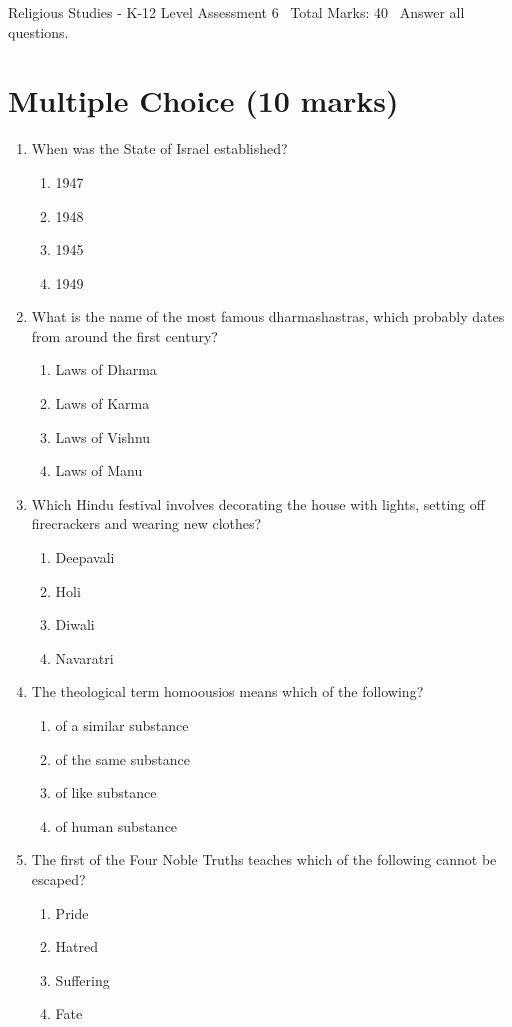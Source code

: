 \documentclass[12pt]{article}
\begin{document}
\begin{center}
Religious Studies - K-12 Level Assessment 6 \
Total Marks: 40 \
Answer all questions.
\end{center}

\section*{Multiple Choice (10 marks)}
\begin{enumerate}[label=\arabic*.]
\item When was the State of Israel established?
\begin{enumerate}[label=(\alph*)]
    \item 1947
    \item 1948
    \item 1945
    \item 1949
\end{enumerate}
\item What is the name of the most famous dharmashastras, which probably dates from around the first century?
\begin{enumerate}[label=(\alph*)]
    \item Laws of Dharma
    \item Laws of Karma
    \item Laws of Vishnu
    \item Laws of Manu
\end{enumerate}
\item Which Hindu festival involves decorating the house with lights, setting off firecrackers and wearing new clothes?
\begin{enumerate}[label=(\alph*)]
    \item Deepavali
    \item Holi
    \item Diwali
    \item Navaratri
\end{enumerate}
\item The theological term homoousios means which of the following?
\begin{enumerate}[label=(\alph*)]
    \item of a similar substance
    \item of the same substance
    \item of like substance
    \item of human substance
\end{enumerate}
\item The first of the Four Noble Truths teaches which of the following cannot be escaped?
\begin{enumerate}[label=(\alph*)]
    \item Pride
    \item Hatred
    \item Suffering
    \item Fate
\end{enumerate}
\end{enumerate}
\end{document}
